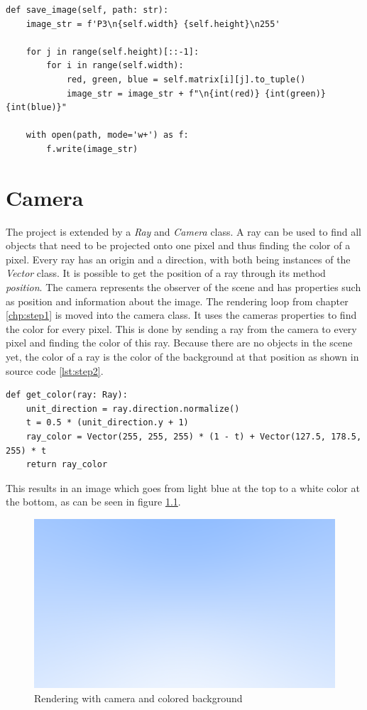 \documentclass[12pt]{report}
\begin{document}
\begin{lstlisting}[caption={Saving an image}, label=lst:saving, style=mystyle]
def save_image(self, path: str):
    image_str = f'P3\n{self.width} {self.height}\n255'
  
    for j in range(self.height)[::-1]:
        for i in range(self.width):
            red, green, blue = self.matrix[i][j].to_tuple()
            image_str = image_str + f"\n{int(red)} {int(green)} {int(blue)}"

    with open(path, mode='w+') as f:
        f.write(image_str)
\end{lstlisting}

\chapter{Camera}
The project is extended by a \textit{Ray} and \textit{Camera} class. A ray can be used to find all objects that need to be projected onto one pixel and thus finding the color of a pixel. Every ray has an origin and a direction, with both being instances of the \textit{Vector} class. It is possible to get the position of a ray through its method \textit{position}. The camera represents the observer of the scene and has properties such as position and information about the image. The rendering loop from chapter \ref{chp:step1} is moved into the camera class. It uses the cameras properties to find the color for every pixel. This is done by sending a ray from the camera to every pixel and finding the color of this ray. Because there are no objects in the scene yet, the color of a ray is the color of the background at that position as shown in source code \ref{lst:step2}.
\begin{lstlisting}[caption={Color of ray}, label=lst:step2, style=mystyle]
def get_color(ray: Ray):
    unit_direction = ray.direction.normalize()
    t = 0.5 * (unit_direction.y + 1)
    ray_color = Vector(255, 255, 255) * (1 - t) + Vector(127.5, 178.5, 255) * t
    return ray_color
\end{lstlisting}
This results in an image which goes from light blue at the top to a white color at the bottom, as can be seen in figure \ref{fig:step2}.
\begin{figure}[h!]
\includegraphics[width=\textwidth]{step2}
\centering
\caption{Rendering with camera and colored background}
\label{fig:step2}
\end{figure}
\end{document}
